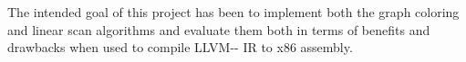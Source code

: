 \documentclass{article}
\begin{document}
The intended goal of this project has been to implement both the graph coloring and linear scan algorithms and evaluate them both in terms of benefits and drawbacks when used to compile LLVM-{}- IR to x86 assembly.





\printbibliography 


\appendix

\newpage

\end{document}

